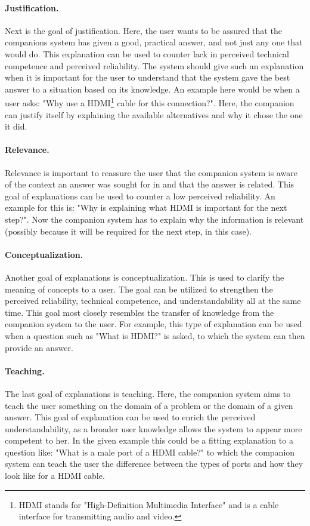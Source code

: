 \documentclass[a4paper]{article}
\begin{document}
\paragraph{Justification.} Next is the goal of justification. Here, the user wants to be assured that the companions system has given a good, practical answer, and not just any one that would do. This explanation can be used to counter lack in perceived technical competence and perceived reliability. The system should give such an explanation when it is important for the user to understand that the system gave the best answer to a situation based on its knowledge. An example here would be when a user asks: "Why use a HDMI\footnote{HDMI stands for "High-Definition Multimedia Interface" and is a cable interface for transmitting audio and video.} cable for this connection?". Here, the companion can justify itself by explaining the available alternatives and why it chose the one it did.

\paragraph{Relevance.} Relevance is important to reassure the user that the companion system is aware of the context an answer was sought for in and that the answer is related. This goal of explanations can be used to counter a low perceived reliability. An example for this is: "Why is explaining what HDMI is important for the next step?". Now the companion system has to explain why the information is relevant (possibly because it will be required for the next step, in this case).

\paragraph{Conceptualization.} Another goal of explanations is conceptualization. This is used to clarify the meaning of concepts to a user. The goal can be utilized to strengthen the perceived reliability, technical competence, and understandability all at the same time. This goal most closely resembles the transfer of knowledge from the companion system to the user. For example, this type of explanation can be used when a question such as "What is HDMI?" is asked, to which the system can then provide an answer.

\paragraph{Teaching.} The last goal of explanations is teaching. Here, the companion system aims to teach the user something on the domain of a problem or the domain of a given answer. This goal of explanation can be used to enrich the perceived understandability, as a broader user knowledge allows the system to appear more competent to her. In the given example this could be a fitting explanation to a question like: "What is a male port of a HDMI cable?" to which the companion system can teach the user the difference between the types of ports and how they look like for a HDMI cable.
\end{document}
